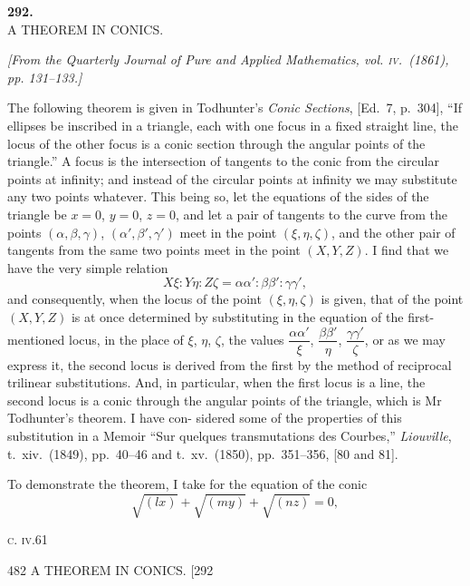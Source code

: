 \documentclass[11pt]{article}
\begin{document}
\begin{center}
\textbf{\large 292.}\\[1ex]
\textsc{A THEOREM IN CONICS.}
\end{center}

\begin{center}
\textit{[From the Quarterly Journal of Pure and Applied Mathematics, vol. \textsc{iv}.\ (1861),
pp. 131--133.]}
\end{center}

\medskip

The following theorem is given in Todhunter's \textit{Conic Sections}, [Ed.~7, p.~304], ``If
ellipses be inscribed in a triangle, each with one focus in a fixed straight line, the
locus of the other focus is a conic section through the angular points of the triangle.''
A focus is the intersection of tangents to the conic from the circular points at infinity;
and instead of the circular points at infinity we may substitute any two points whatever.
This being so, let the equations of the sides of the triangle be $x=0$, $y=0$, $z=0$, and
let a pair of tangents to the curve from the points $(\alpha,\beta,\gamma)$, $(\alpha',\beta',\gamma')$ meet in the
point $(\xi,\eta,\zeta)$, and the other pair of tangents from the same two points meet in the
point $(X,Y,Z)$. I find that we have the very simple relation
\[ X\xi : Y\eta : Z\zeta = \alpha\alpha' : \beta\beta' : \gamma\gamma', \]
and consequently, when the locus of the point $(\xi,\eta,\zeta)$ is given, that of the point
$(X,Y,Z)$ is at once determined by substituting in the equation of the first-mentioned
locus, in the place of $\xi$, $\eta$, $\zeta$, the values $\dfrac{\alpha\alpha'}{\xi}$, $\dfrac{\beta\beta'}{\eta}$, $\dfrac{\gamma\gamma'}{\zeta}$, or as we may express it, the
second locus is derived from the first by the method of reciprocal trilinear substitutions.
And, in particular, when the first locus is a line, the second locus is a conic through
the angular points of the triangle, which is Mr Todhunter's theorem. I have con-%
sidered some of the properties of this substitution in a Memoir ``Sur quelques
transmutations des Courbes,'' \textit{Liouville}, t.\ xiv.\ (1849), pp.\ 40--46 and t.\ xv.\ (1850), pp.\
351--356, [80 and 81].

To demonstrate the theorem, I take for the equation of the conic
\[ \sqrt{(lx)}+\sqrt{(my)}+\sqrt{(nz)}=0, \]

\medskip
\hfill\textsc{c. iv.}\hfill 61\hfill\hfill

\newpage
\begin{center}
482 \hfill A THEOREM IN CONICS. \hfill \textsc{[292}
\end{center}
\end{document}
